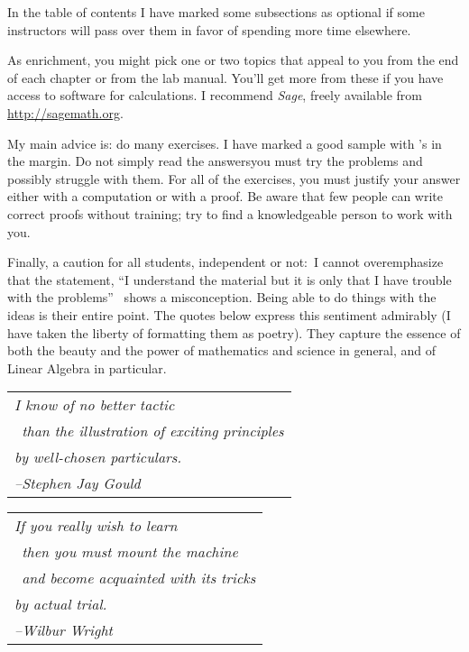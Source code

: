 {In the table of contents
I have marked some subsections as optional if
some instructors will pass over them in favor of spending more time elsewhere. 

As enrichment, you might pick one or two topics that appeal to you 
from the end of each chapter or from the lab manual.
You'll get more from these
if you have access to software for calculations.
I recommend \textit{Sage}, freely available 
from \url{http://sagemath.org}.

My main advice is: do many exercises.
I have marked a good sample with \recommendationmark's in the margin.
Do not simply read the answers\Dash you must
try the problems and possibly struggle with them.
For all of the exercises, you must justify your answer either with a computation
or with a proof.
Be aware that few people can write correct proofs without training;
try to find a knowledgeable person to work with you.

Finally, a caution for all students, independent or not:~I 
cannot overemphasize that the 
statement, ``I understand the material but it is only 
that I have trouble with the problems''\ %
shows a misconception.
Being able to do things with the ideas is their entire point.
The quotes below express this sentiment admirably
(I have taken the liberty of formatting them as poetry).
They capture the essence of both the beauty and the power
of mathematics and science in general, 
and of Linear Algebra in particular.

\bigskip
\par\noindent\begin{tabular}[t]{@{}l@{}}
  \textit{I know of no better tactic}                     \\
  \textit{\ than the illustration of exciting principles} \\
  \textit{by well-chosen particulars.}                    \\
  \hspace*{1in}\textit{--Stephen Jay Gould}
\end{tabular}

\bigskip
\par\noindent
\begin{tabular}[t]{@{}l@{}}   
\textit{If you really wish to learn}                     \\
   \textit{\ then you must mount the machine}  \\ 
   \textit{\ and become acquainted with its tricks} \\
   \textit{by actual trial.}                    \\
   \hspace*{1in}\textit{--Wilbur Wright}
\end{tabular}

}
